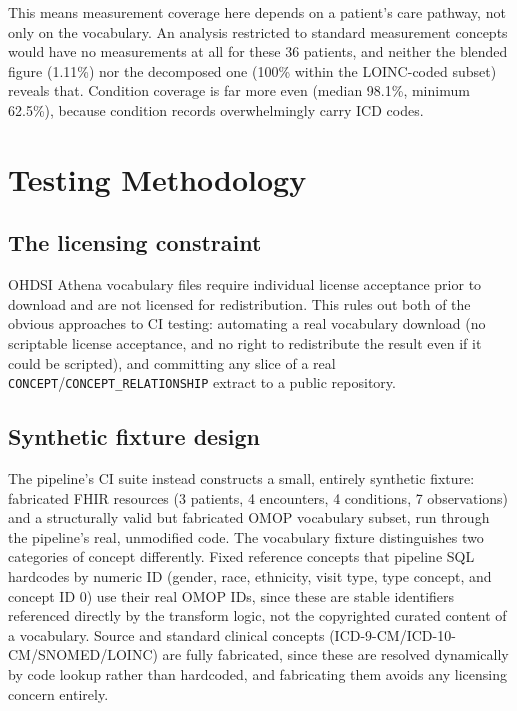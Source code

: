 \documentclass[11pt]{article}
\begin{document}
This means measurement coverage here depends on a patient's care pathway,
not only on the vocabulary. An analysis restricted to standard measurement
concepts would have no measurements at all for these 36 patients, and
neither the blended figure (1.11\%) nor the decomposed one (100\% within
the LOINC-coded subset) reveals that. Condition coverage is far more even
(median 98.1\%, minimum 62.5\%), because condition records
overwhelmingly carry ICD codes.

\section{Testing Methodology}
\label{sec:testing}

\subsection{The licensing constraint}

OHDSI Athena vocabulary files require individual license acceptance prior
to download and are not licensed for redistribution. This rules out both
of the obvious approaches to CI testing: automating a real vocabulary
download (no scriptable license acceptance, and no right to redistribute
the result even if it could be scripted), and committing any slice of a
real \texttt{CONCEPT}/\texttt{CONCEPT\_RELATIONSHIP} extract to a public
repository.

\subsection{Synthetic fixture design}

The pipeline's CI suite instead constructs a small, entirely synthetic
fixture: fabricated FHIR resources (3 patients, 4 encounters, 4 conditions,
7 observations) and a structurally valid but fabricated OMOP vocabulary
subset, run through the pipeline's real, unmodified code. The vocabulary
fixture distinguishes two categories of concept differently. Fixed
reference concepts that pipeline SQL hardcodes by numeric ID (gender, race,
ethnicity, visit type, type concept, and concept ID 0) use their real OMOP
IDs, since these are stable identifiers referenced directly by the
transform logic, not the copyrighted curated content of a vocabulary.
Source and standard clinical concepts (ICD-9-CM/ICD-10-CM/SNOMED/LOINC) are
fully fabricated, since these are resolved dynamically by code lookup
rather than hardcoded, and fabricating them avoids any licensing concern
entirely.
\end{document}
